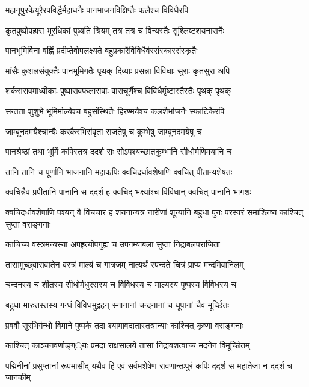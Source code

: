 \twolineshloka
{महानूपुरकेयूरैरपविद्धैर्महाधनैः}
{पानभाजनविक्षिप्तैः फलैश्च विविधैरपि} %

\twolineshloka
{कृतपुष्पोपहारा भूरधिकां पुष्यति श्रियम्}
{तत्र तत्र च विन्यस्तैः सुश्लिष्टशयनासनैः} %

\twolineshloka
{पानभूमिर्विना वह्निं प्रदीप्तेवोपलक्ष्यते}
{बहुप्रकारैर्विविधैर्वरसंस्कारसंस्कृतैः} %

\twolineshloka
{मांसैः कुशलसंयुक्तैः पानभूमिगतैः पृथक्}
{दिव्याः प्रसन्ना विविधाः सुराः कृतसुरा अपि} %

\twolineshloka
{शर्करासवमाध्वीकाः पुष्पासवफलासवाः}
{वासचूर्णैश्च विविधैर्मृष्टास्तैस्तैः पृथक् पृथक्} %

\twolineshloka
{सन्तता शुशुभे भूमिर्माल्यैश्च बहुसंस्थितैः}
{हिरण्मयैश्च कलशैर्भाजनैः स्फाटिकैरपि} %

\twolineshloka
{जाम्बूनदमयैश्चान्यैः करकैरभिसंवृता}
{राजतेषु च कुम्भेषु जाम्बूनदमयेषु च} %

\twolineshloka
{पानश्रेष्ठां तथा भूमिं कपिस्तत्र ददर्श सः}
{सोऽपश्यच्छातकुम्भानि सीधोर्मणिमयानि च} %

\twolineshloka
{तानि तानि च पूर्णानि भाजनानि महाकपिः}
{क्वचिदर्धावशेषाणि क्वचित् पीतान्यशेषतः} %

\twolineshloka
{क्वचिन्नैव प्रपीतानि पानानि स ददर्श ह}
{क्वचिद् भक्ष्यांश्च विविधान् क्वचित् पानानि भागशः} %

\threelineshloka
{क्वचिदर्धावशेषाणि पश्यन् वै विचचार ह}
{शयनान्यत्र नारीणां शून्यानि बहुधा पुनः}
{परस्परं समाश्लिष्य काश्चित् सुप्ता वराङ्गनाः} %

\twolineshloka
{काचिच्च वस्त्रमन्यस्या अपहृत्योपगुह्य च}
{उपगम्याबला सुप्ता निद्राबलपराजिता} %

\twolineshloka
{तासामुच्छ्वासवातेन वस्त्रं माल्यं च गात्रजम्}
{नात्यर्थं स्पन्दते चित्रं प्राप्य मन्दमिवानिलम्} %

\twolineshloka
{चन्दनस्य च शीतस्य सीधोर्मधुरसस्य च}
{विविधस्य च माल्यस्य पुष्पस्य विविधस्य च} %

\twolineshloka
{बहुधा मारुतस्तस्य गन्धं विविधमुद्वहन्}
{स्नानानां चन्दनानां च धूपानां चैव मूर्च्छितः} %

\twolineshloka
{प्रववौ सुरभिर्गन्धो विमाने पुष्पके तदा}
{श्यामावदातास्तत्रान्याः काश्चित् कृष्णा वराङ्गनाः} %

\twolineshloka
{काश्चित् काञ्चनवर्णाङ्ग््यः प्रमदा राक्षसालये}
{तासां निद्रावशत्वाच्च मदनेन विमूर्च्छितम्} %

\threelineshloka
{पद्मिनीनां प्रसुप्तानां रूपमासीद् यथैव हि}
{एवं सर्वमशेषेण रावणान्तःपुरं कपिः}
{ददर्श स महातेजा न ददर्श च जानकीम्} %


